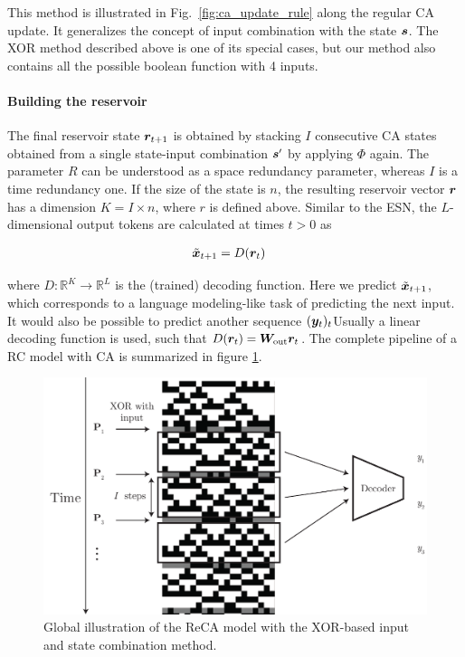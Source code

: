 This method is illustrated in Fig.~\ref{fig:ca_update_rule} along the regular CA
update. It generalizes the concept of input combination with the state ${\bm{s}}$.
The XOR method described above is one of its special cases, but our method also
contains all the possible boolean function with 4 inputs.

\paragraph{Building the reservoir}
The final reservoir state ${\bm{r}}_{t + 1}$ is obtained by stacking $I$ consecutive
CA states obtained from a single state-input combination ${\bm{s}}'$ by applying $\Phi$
again. The parameter $R$ can be understood as a space redundancy parameter,
whereas $I$ is a time redundancy one. If the size of the state is $n$, the
resulting reservoir vector ${\bm{r}}$ has a dimension $K = I \times n$, where $r$ is
defined above. Similar to the \ac{ESN}, the $L$-dimensional output tokens are
calculated at times $t > 0$ as

\begin{equation}
  \begin{aligned}
    \tilde{{\bm{x}}}_{t+ 1} & = D({\bm{r}}_{t})
  \end{aligned}
\end{equation}

where $D: \mathbb{R}^{K} \rightarrow \mathbb{R}^{L}$ is the (trained) decoding function. Here we predict
$\tilde{{\bm{x}}}_{t+1}$, which corresponds to a language modeling-like task of
predicting the next input. It would also be possible to predict another sequence
$({\bm{y}}_{t})_{t}$Usually a linear decoding function is used, such that
$D({\bm{r}}_{t}) = {\bm{W}}_{\text{out}}{\bm{r}}_{t}$. The complete pipeline of a \ac{RC} model
with \ac{CA} is summarized in figure \ref{fig:reca-schema}.

\begin{figure}[htbp]
  \centering
  \includegraphics[width=.6\linewidth]{figures/reca_schema.pdf}
  \caption{Global illustration of the ReCA model with the XOR-based input and
    state combination method.}\label{fig:reca-schema}
\end{figure}

